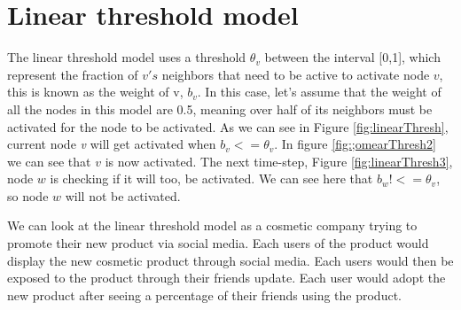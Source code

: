 \section{Linear threshold model}
The linear threshold model uses a threshold $\theta_v$ between the interval [0,1], which represent the fraction of $\textit{v}'s$ neighbors that need to be active to activate node $\textit{v}$, this is known as the weight of v, $b_v$. In this case, let's assume that the weight of all the nodes in this model are 0.5, meaning over half of its neighbors must be activated for the node to be activated. As we can see in Figure \ref{fig:linearThresh}, current node {\textit v} will get activated when $b_v <= \theta_v$. In figure \ref{fig:;omearThresh2} we can see that $v$ is now activated. The next time-step, Figure \ref{fig:linearThresh3}, node $w$ is checking if it will too, be activated. We can see here that $b_w !<= \theta_v$, so node $w$ will not be activated.  

We can look at the linear threshold model as a cosmetic company trying to promote their new product via social media. Each users of the product would display the new cosmetic product through social media. Each users would then be exposed to the product through their friends update. Each user would adopt the new product after seeing a percentage of their friends using the product. 


